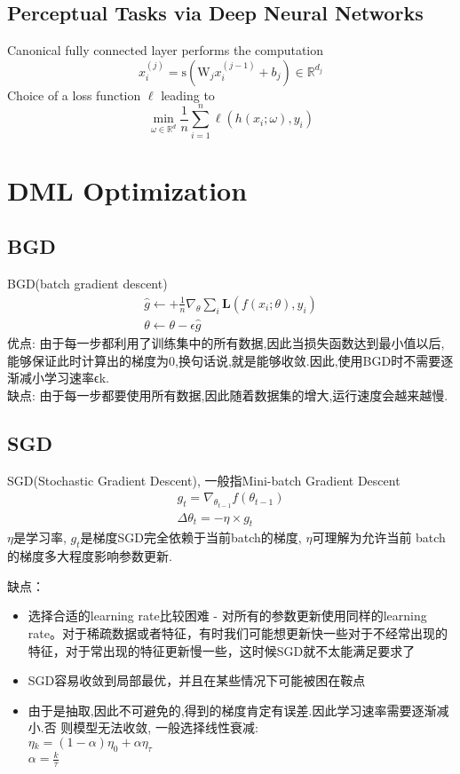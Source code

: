 \documentclass[hyperref, UTF-8]{ctexart}
\begin{document}
\subsection{Perceptual Tasks via Deep Neural Networks}
Canonical fully connected layer performs the computation
\begin{equation}
  x_i^{(j)} = \mathrm{ s }(\mathrm{ W }_j x_i^{(j-1)}+b_j) \in \mathbb{R}^{d_j}
\end{equation}
Choice of a loss function $\ell$ leading to
\begin{equation}
  \min_{\omega\in\mathbb{R}^d} \frac{1}{n} \sum_{i=1}^n \ell(h(x_i;\omega), y_i)
\end{equation}


\section{DML Optimization}
\subsection{BGD}
BGD(batch gradient descent)
\begin{eqnarray*}
  \hat{g} \leftarrow + \frac{1}{n} \nabla_{\theta}\sum_i
  \mathbf{L}(f(x_i;\theta),y_i) \\
  \theta \leftarrow \theta - \epsilon \hat{g}
\end{eqnarray*}
优点: 由于每一步都利用了训练集中的所有数据,因此当损失函数达到最小值以后,能够保证此时计算出的梯度为0,换句话说,就是能够收敛.因此,使用BGD时不需要逐渐减小学习速率ϵk. \\
缺点: 由于每一步都要使用所有数据,因此随着数据集的增大,运行速度会越来越慢.
\subsection{SGD}
SGD(Stochastic Gradient Descent), 一般指Mini-batch Gradient Descent
\begin{eqnarray*}
  g_t = \nabla_{\theta_{t-1}}f(\theta_{t-1})  \\
  \Delta{\theta_t} = -\eta\times g_t
\end{eqnarray*}
$\eta$是学习率, $g_t$是梯度SGD完全依赖于当前batch的梯度, $\eta$可理解为允许当前
batch的梯度多大程度影响参数更新.

缺点：
\begin{itemize}
\item 选择合适的learning rate比较困难 - 对所有的参数更新使用同样的learning rate。对于稀疏数据或者特征，有时我们可能想更新快一些对于不经常出现的特征，对于常出现的特征更新慢一些，这时候SGD就不太能满足要求了
\item SGD容易收敛到局部最优，并且在某些情况下可能被困在鞍点
\item 由于是抽取,因此不可避免的,得到的梯度肯定有误差.因此学习速率需要逐渐减小.否
  则模型无法收敛, 一般选择线性衰减:  \\ $\eta{_k}=(1−\alpha)\eta_0+\alpha\eta_{\tau}$  \\
  $\alpha=\frac{k}{\tau}$
\end{itemize}
\end{document}
